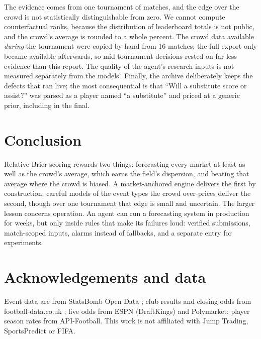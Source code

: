 \documentclass[11pt]{article}
\begin{document}
The evidence comes from one tournament of \MatchesOne{} matches, and the edge over the crowd is
not statistically distinguishable from zero. We cannot compute counterfactual ranks, because
the distribution of leaderboard totals is not public, and the crowd's average is rounded to a
whole percent. The crowd data available \emph{during} the tournament were copied by hand from
16 matches; the full export only became available afterwards, so mid-tournament decisions rested
on far less evidence than this report. The quality of the agent's research inputs is not
measured separately from the models'. Finally, the archive deliberately keeps the defects that
ran live; the most consequential is that ``Will a substitute score or assist?'' was parsed as a
player named ``a substitute'' and priced at a generic prior, including in the final.

\section{Conclusion}\label{sec:conclusion}

Relative Brier scoring rewards two things: forecasting every market at least as well as the
crowd's average, which earns the field's dispersion, and beating that average where the crowd is
biased. A market-anchored engine delivers the first by construction; careful models of the
event types the crowd over-prices deliver the second, though over one tournament that edge is
small and uncertain. The larger lesson concerns operation. An agent can run a forecasting system
in production for weeks, but only inside rules that make its failures loud: verified submissions,
match-scoped inputs, alarms instead of fallbacks, and a separate entry for experiments.

\FloatBarrier
\section*{Acknowledgements and data}

Event data are from StatsBomb Open Data \citep{statsbomb}; club results and closing odds from
football-data.co.uk \citep{footballdata}; live odds from ESPN (DraftKings) and Polymarket; player
season rates from API-Football. This work is not affiliated with Jump Trading, SportsPredict or
FIFA.




\clearpage
\appendix
\end{document}
